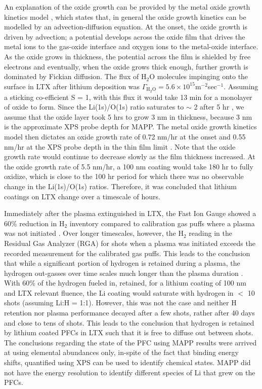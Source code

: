 \documentclass[aip,rsi,amsmath,amssymb,reprint]{revtex4-1}
\begin{document}
An explanation of the oxide growth can be provided by the metal oxide growth kinetics model \cite{53}, which states that, in general the oxide growth kinetics can be modelled by an advection-diffusion equation. At the onset, the oxide growth is driven by advection; a potential develops across the oxide film that drives the metal ions to the gas-oxide interface and oxygen ions to the metal-oxide interface. As the oxide grows in thickness, the potential across the film is shielded by free electrons and eventually, when the oxide grows thick enough, further growth is dominated by Fickian diffusion. The flux of H$_2$O molecules impinging onto the surface in LTX after lithium deposition was $\Gamma_{\text{H}_2\text{O}} = 5.6 \times 10^{15} $m$^{-2}$sec$^{-1}$. Assuming a sticking co-efficient\cite{51} S = 1, with this flux it would take 13 min for a monolayer of oxide to form. Since the Li(1s)/O(1s) ratio saturates to $\sim$ 2 after 5 hr \cite{lucia-thesis,lucia-paper}, we assume that the oxide layer took 5 hrs to grow 3 nm in thickness, because 3 nm is the approximate XPS probe depth for MAPP. The metal oxide growth kinetics model then dictates an oxide growth rate of 0.72 nm/hr at the onset and 0.55 nm/hr at the XPS probe depth in the thin film limit \cite{thin-film}. Note that the oxide growth rate would continue to decrease slowly as the film thickness increased. At the oxide growth rate of 5.5 nm/hr, a 100 nm coating would take 180 hr to fully oxidize, which is close to the 100 hr period for which there was no observable change in the Li(1s)/O(1s) ratios. \cite{lucia-thesis,lucia-paper} Therefore, it was concluded that lithium coatings on LTX change over a timescale of hours. 

Immediately after the plasma extinguished in LTX, the Fast Ion Gauge showed a 60\% reduction in H$_2$ inventory compared to calibration gas puffs where a plasma was not initiated \cite{bob-lucia,boyle-prl}. Over longer timescales, however, the H$_2$ reading in the Residual Gas Analyzer (RGA) for shots when a plasma was initiated exceeds the recorded measurement for the calibrated gas puffs. This leads to the conclusion that while a significant portion of hydrogen is retained during a plasma, the hydrogen out-gasses over time scales much longer than the plasma duration \cite{bob-lucia}. With 60\% of the hydrogen fueled in, retained, for a lithium coating of 100 nm and LTX relevant fluence, the Li coating would saturate with hydrogen in $<$ 10 shots (assuming Li:H = 1:1). However, this was not the case and neither H retention nor plasma performance decayed after a few shots, rather after 40 days and close to tens of shots. This leads to the conclusion that hydrogen is retained by lithium coated PFCs in LTX such that it is free to diffuse out between shots. The conclusions regarding the state of the PFC using MAPP results were arrived at using elemental abundances only, in-spite of the fact that binding energy shifts, quantified using XPS can be used to identify chemical states. MAPP did not have the energy resolution to identify different species of Li that grew on the PFCs.
\end{document}
